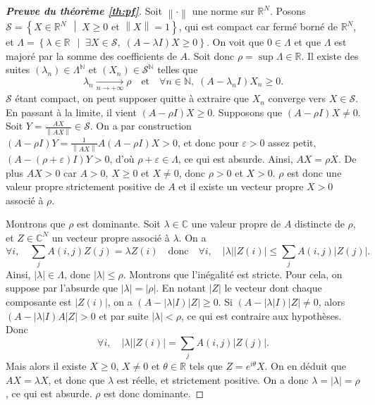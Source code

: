 \documentclass[11pt]{article}
\newcommand{\ens}[3][\middle|]{
    \left\{#2 \;\, #1 \; #3\right\}
}
\newcommand{\R}{\mathbb{R}}
\newcommand{\N}{\mathbb{N}}
\newcommand{\C}{\mathbb{C}}
\newcommand{\module}[1]{\left\lvert #1 \right\rvert}
\newcommand{\norm}[1]{\left\lVert #1 \right\rVert}
\renewcommand{\leq}{\leqslant}
\renewcommand{\geq}{\geqslant}
\theoremstyle{plain}
\begin{document}
\begin{proof}[\emph{\textbf{Preuve du théorème \ref{th:pf}}}]
    Soit $\norm{\cdot}$ une norme sur $\R^{N}$. Posons $\mathcal{S} = \ens{X \in \R^N}{X \geq 0 \text{ et } \norm{X} = 1}$, qui est compact car fermé borné de $\R^N$, et $\Lambda = \ens{\lambda \in \R}{\exists X \in \mathcal{S}, \; (A - \lambda I)X \geq 0}$. On voit que $0 \in \Lambda$ et que $\Lambda$ est majoré par la somme des coefficients de $A$. Soit donc $\rho = \sup \Lambda \in \R$. Il existe des suites $(\lambda_n) \in \Lambda^{\N}$ et $(X_n) \in \mathcal{S}^{\N}$ telles que
    $$\lambda_n \xrightarrow[n \to + \infty]{} \rho \quad \text{et} \quad \forall n \in \N, \; (A - \lambda_n I) X_n \geq 0.$$
    $\mathcal{S}$ étant compact, on peut supposer quitte à extraire que $X_n$ converge vers $X \in \mathcal{S}$. En passant à la limite, il vient $(A - \rho I)X \geq 0$. Supposons que $(A - \rho I)X \neq 0$. Soit $Y = \frac{AX}{\norm{AX}} \in \mathcal{S}$. On a par construction $(A - \rho I)Y = \frac{1}{\norm{AX}}A(A - \rho I)X > 0$, et donc pour $\varepsilon > 0$ assez petit, $(A - (\rho + \varepsilon) I)Y > 0$, d'où $\rho + \varepsilon \in \Lambda$, ce qui est absurde. Ainsi, $AX = \rho X$. De plus $AX > 0$ car $A > 0$, $X \geq 0$ et $X \neq 0$, donc $\rho > 0$ et $X > 0$. $\rho$ est donc une valeur propre strictement positive de $A$ et il existe un vecteur propre $X > 0$ associé à $\rho$.

    Montrons que $\rho$ est dominante. Soit $\lambda \in \C$ une valeur propre de $A$ distincte de $\rho$, et $Z \in \C^N$ un vecteur propre associé à $\lambda$. On a
    $$\forall i, \quad \sum_j A(i,j)Z(j) = \lambda Z(i) \quad \text{donc} \quad \forall i, \quad  \module{\lambda}\module{Z(i)} \leq \sum_j A(i,j) \module{Z(j)}.$$ Ainsi, $\module{\lambda} \in \Lambda$, donc $\module{\lambda} \leq \rho$. Montrons que l'inégalité est stricte. Pour cela, on suppose par l'absurde que $\module{\lambda} = \module{\rho}$. En notant $\module{Z}$ le vecteur dont chaque composante est $\module{Z(i)}$, on a $(A - \module{\lambda}I)\module{Z} \geq 0$. Si $(A - \module{\lambda}I)\module{Z} \neq 0$, alors $(A - \module{\lambda}I)A\module{Z} > 0$ et par suite $\module{\lambda} < \rho$, ce qui est contraire aux hypothèses. Donc 
    $$\forall i, \quad \module{\lambda}\module{Z(i)} = \sum_j A(i,j) \module{Z(j)}.$$ Mais alors il existe $X \geq 0$, $X \neq 0$ et $\theta \in \R$ tels que $Z = e^{i\theta}X$. On en déduit que $AX = \lambda X$, et donc que $\lambda$ est réelle, et strictement positive. On a donc $\lambda = \module{\lambda} = \rho$, ce qui est absurde. $\rho$ est donc dominante.


\end{proof}
\end{document}
